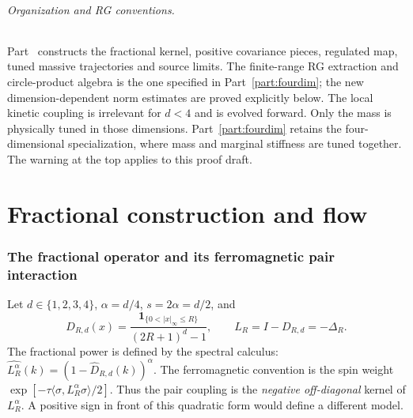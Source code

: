 \documentclass[11pt]{article}
\begin{document}
\paragraph{Organization and RG conventions.}
Part~\ref{part:fractional} constructs the fractional kernel, positive
covariance pieces, regulated map, tuned massive trajectories and source
limits. The finite-range RG extraction and circle-product algebra is
the one specified in Part~\ref{part:fourdim}; the new dimension-dependent
norm estimates are proved explicitly below. The local kinetic coupling
is irrelevant for \(d<4\) and is evolved forward. Only the mass is
physically tuned in those dimensions. Part~\ref{part:fourdim} retains
the four-dimensional specialization, where mass and marginal stiffness
are tuned together. The warning at the top applies to this proof draft.

\part{Fractional construction and flow}\label{part:fractional}

\section{The fractional operator and its ferromagnetic pair interaction}
\label{frac:operator}

Let \(d\in\{1,2,3,4\}\), \(\alpha=d/4\), \(s=2\alpha=d/2\), and
\[
 D_{R,d}(x)=\frac{\boldsymbol1_{\{0<|x|_\infty\le R\}}}
                         {(2R+1)^d-1},\qquad
 L_R=I-D_{R,d}=-\Delta_R.
\]
The fractional power is defined by the spectral calculus:
\(\widehat{L_R^\alpha}(k)=(1-\widehat D_{R,d}(k))^\alpha\).
The ferromagnetic convention is the spin weight
\(\exp[-\tau\langle\sigma,L_R^\alpha\sigma\rangle/2]\).
Thus the pair coupling is the \emph{negative off-diagonal} kernel of
\(L_R^\alpha\). A positive sign in front of this quadratic form
would define a different model.
\end{document}
